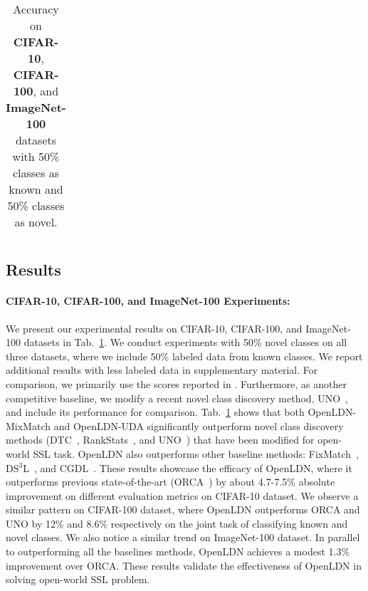 \documentclass[runningheads]{eccv2022submission}
\begin{document}
\begin{table}[t]
\begin{center}
{\begin{tabular}{lccccccccc}
\hline

\hline
\end{tabular}
}
\end{center}
\caption{\small Accuracy on \textbf{CIFAR-10}, \textbf{CIFAR-100}, and \textbf{ImageNet-100} datasets with 50\% classes as known and 50\% classes as novel.}
\label{tab:cifar10}
\vspace{-4mm}
\end{table}


\vspace{-2mm}
\subsection{Results}
\paragraph{\textbf{CIFAR-10, CIFAR-100, and ImageNet-100 Experiments:}}
We present our experimental results on CIFAR-10, CIFAR-100, and ImageNet-100 datasets in Tab.~\ref{tab:cifar10}. We conduct experiments with 50\% novel classes on all three datasets, where we include 50\% labeled data from known classes. We report additional results with less labeled data in supplementary material. For comparison, we primarily use the scores reported in \cite{cao2022openworld}. Furthermore, as another competitive baseline, we modify a recent novel class discovery method, UNO~\cite{fini2021unified}, and include its performance for comparison. Tab.~\ref{tab:cifar10} shows that both OpenLDN-MixMatch and OpenLDN-UDA significantly outperform novel class discovery methods (DTC~\cite{han2019learning}, RankStats~\cite{Han2020Automatically}, and UNO~\cite{fini2021unified}) that have been modified for open-world SSL task. OpenLDN also outperforms other baseline methods: FixMatch~\cite{FixMatch}, DS$^3$L~\cite{guo2020safe}, and CGDL~\cite{sun2020conditional}. These results showcase the efficacy of OpenLDN, where it outperforms previous state-of-the-art (ORCA~\cite{cao2022openworld}) by about 4.7-7.5\% absolute improvement on different evaluation metrics on CIFAR-10 dataset. We observe a similar pattern on CIFAR-100 dataset, where OpenLDN outperforms ORCA and UNO by 12\% and 8.6\% respectively on the joint task of classifying known and novel classes. We also notice a similar trend on ImageNet-100 dataset. In parallel to outperforming all the baselines methods, OpenLDN achieves a modest 1.3\% improvement over ORCA. These results validate the effectiveness of OpenLDN in solving open-world SSL problem. 
\end{document}
